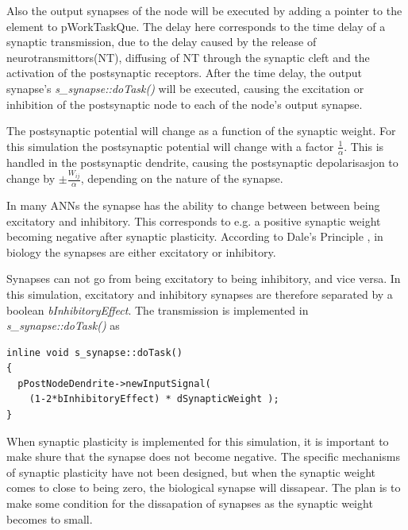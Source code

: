 	Also the output synapses of the node will be executed by adding a pointer to the element to pWorkTaskQue.
	The delay here corresponds to the time delay of a synaptic transmission, due to the delay caused by the release of neurotransmittors(NT), diffusing of NT through the synaptic cleft and the activation of the postsynaptic receptors.
	After the time delay, the output synapse's \emph{s\_synapse::doTask()} will be executed, causing the excitation or inhibition of the postsynaptic node to each of the node's output synapse. 
	
	The postsynaptic potential will change as a function of the synaptic weight. For this simulation the postsynaptic potential will change with a factor $\frac{1}{\alpha}$. %
	This is handled in the postsynaptic dendrite, causing the postsynaptic depolarisasjon to change by $\pm \frac{W_{ij}}{\alpha}$, depending on the nature of the synapse.

	In many ANNs the synapse has the ability to change between between being excitatory and inhibitory. 
	This corresponds to e.g. a positive synaptic weight becoming negative after synaptic plasticity.
	According to Dale's Principle %
		, in biology the synapses are either excitatory or inhibitory.

	Synapses can not go from being excitatory to being inhibitory, and vice versa.
	In this simulation, excitatory and inhibitory synapses are therefore separated by a boolean \emph{bInhibitoryEffect}. The transmission is implemented in \emph{s\_synapse::doTask()} as
\begin{lstlisting}
inline void s_synapse::doTask()
{
  pPostNodeDendrite->newInputSignal( 
    (1-2*bInhibitoryEffect) * dSynapticWeight );
}
\end{lstlisting}
	When synaptic plasticity is implemented for this simulation, it is important to make shure that the synapse does not become negative. 
	The specific mechanisms of synaptic plasticity have not been designed, but when the synaptic weight comes to close to being zero, the biological synapse will dissapear.
	The plan is to make some condition for the dissapation of synapses as the synaptic weight becomes to small.

